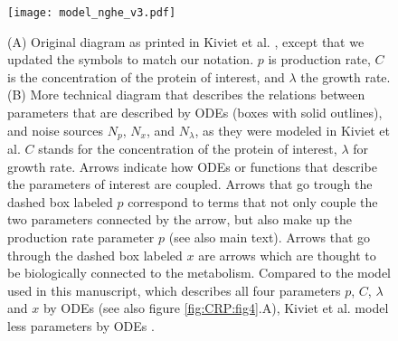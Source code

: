 \begin{figure}
	\centering
	\texttt{[image: model\_nghe\_v3.pdf]}
	\caption{ 
		(A) Original diagram as printed in Kiviet et al. \cite{Kiviet2014}, except that we updated the symbols to match our notation. 
        $p$ is production rate, $C$ is the concentration of the protein of interest, and $\lambda$ the growth rate.
		(B) More technical diagram that describes the relations between parameters that are described by ODEs (boxes with solid outlines), and noise sources $N_p$, $N_x$, and $N_\lambda$, as they were modeled in Kiviet et al. 
        $C$ stands for the concentration of the protein of interest, $\lambda$ for growth rate. 
        Arrows indicate how ODEs or functions that describe the parameters of interest are coupled. 
		Arrows that go trough the dashed box labeled $p$ correspond to terms that not only couple the two parameters connected by the arrow, but also make up the production rate parameter $p$ (see also main text).
		Arrows that go through the dashed box labeled $x$ are arrows which are thought to be biologically connected to the metabolism.
        Compared to the model used in this manuscript, which describes all four parameters $p$, $C$, $\lambda$ and $x$ by ODEs (see also figure \ref{fig:CRP:fig4}.A), 
        Kiviet et al. model less parameters by ODEs \cite{Kiviet2014}.
	}
	\label{fig:modeldrawing}
\end{figure}

